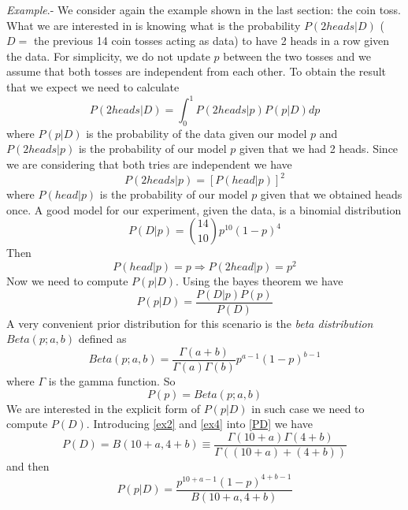 \documentclass[onecolumn,           %
               showpacs,            %
               preprintnumbers,     %
               aps,                 %
               prl,          	    %
               letterpaper,             %
               superscriptaddress,      %
               nofootinbib,         %
               tightenlines,        %
               floats,floatfix      %
               ,usenatbib,
               ]{revtex4-1}
\begin{document}
\textit{Example}.- We consider again the example shown in the last section: the coin toss. What we are interested in is knowing what is the probability $P(2heads|D)$ ($D=$ the previous 14 coin tosses acting as data) to have 2 heads in a row given the data. For simplicity, we do not update $p$ between the two tosses and we assume that both tosses are independent from each other. To obtain the result that we expect we need to calculate
\begin{equation}\label{ex}
P(2heads|D)=\int^1_0 P(2heads|p)P(p|D)dp
\end{equation}
where $P(p|D)$ is the probability of the data given our model $p$ and $P(2heads|p)$ is the probability of our model $p$ given that we had 2 heads. Since we are considering that both tries are independent we have
\begin{equation}
P(2heads|p)=[P(head|p)]^2
\end{equation}
where $P(head|p)$ is the probability of our model $p$ given that we obtained heads once. A good model for our experiment, given the data, is a binomial distribution
\begin{equation}\label{ex2}
P(D|p)=\binom{14}{10}p^{10}(1-p)^4
\end{equation}
Then 
\begin{equation}\label{ex1}
P(head|p)=p\Rightarrow P(2head|p)=p^2
\end{equation}
Now we need to compute $P(p|D)$. Using the bayes theorem we have
\begin{equation}
P(p|D)=\frac{P(D|p)P(p)}{P(D)}
\end{equation}
A very convenient prior distribution for this scenario is the \textit{beta distribution} $Beta(p;a,b)$ defined as
\begin{equation}\label{ex3}
Beta(p;a,b)=\frac{\Gamma(a+b)}{\Gamma(a)\Gamma(b)}p^{a-1}(1-p)^{b-1}
\end{equation}
where $\Gamma$ is the gamma function. So
\begin{equation}\label{ex4}
P(p)=Beta(p;a,b)
\end{equation}
We are interested in the explicit form of $P(p|D)$ in such case we need to compute $P(D)$. Introducing \eqref{ex2} and \eqref{ex4} into \eqref{PD} we have
\begin{equation}
P(D)=B(10+a,4+b)\equiv \frac{\Gamma(10+a)\Gamma(4+b)}{\Gamma((10+a)+(4+b))}
\end{equation}
and then
\begin{equation}\label{ex5}
P(p|D)=\frac{p^{10+a-1}(1-p)^{4+b-1}}{B(10+a,4+b)}
\end{equation}
\end{document}
